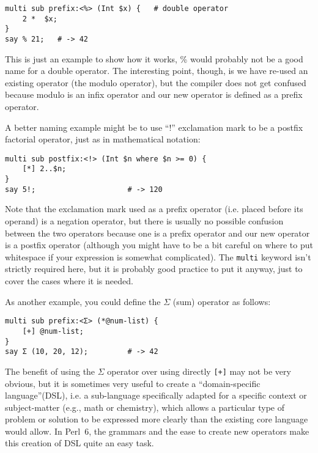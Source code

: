 \begin{verbatim}
multi sub prefix:<%> (Int $x) {   # double operator
    2 *  $x;
}
say % 21;   # -> 42
\end{verbatim}

This is just an example to show how it works, \% would 
probably not be a good name for a double operator. The 
interesting point, though, is we have re-used an existing 
operator (the modulo operator), but the compiler does not 
get confused because modulo is an infix operator and our 
new operator is defined as a prefix operator.

A better naming example might be to use ``!'' exclamation 
mark to be a postfix factorial operator, just as in 
mathematical notation:

\begin{verbatim}
multi sub postfix:<!> (Int $n where $n >= 0) {
    [*] 2..$n;
}
say 5!;                     # -> 120
\end{verbatim}

Note that the exclamation mark used as a prefix 
operator (i.e. placed before its operand) is 
a negation operator, but there is usually no possible 
confusion between the two operators because one is a 
prefix operator and our new operator is a postfix operator 
(although you might have to be a bit careful on where 
to put whitespace if your expression is somewhat 
complicated). The {\tt multi} keyword isn't strictly 
required here, but it is probably good practice to 
put it anyway, just to cover the cases where it is 
needed. 

As another example, you could define the $\Sigma$ (sum) 
operator as follows:

\begin{verbatim}
multi sub prefix:<Σ> (*@num-list) {
    [+] @num-list;
}
say Σ (10, 20, 12);         # -> 42
\end{verbatim}

The benefit of using the $\Sigma$ operator over using 
directly \verb'[+]' may not be very obvious, but it is 
sometimes very useful to create a ``domain-specific 
language''(DSL), i.e. a sub-language specifically 
adapted for a specific context or subject-matter (e.g., math 
or chemistry), which allows a particular type of problem 
or solution to be expressed more clearly than the 
existing core language would allow. In Perl~6, the 
grammars and the ease to create new operators make 
this creation of DSL quite an easy task.


